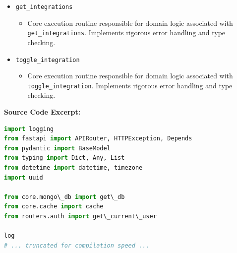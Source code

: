 \documentclass[10pt,journal,compsoc]{IEEEtran}
\begin{document}
\begin{itemize}
    \item \texttt{get\_integrations}
    \begin{itemize} \item Core execution routine responsible for domain logic associated with \texttt{get\_integrations}. Implements rigorous error handling and type checking. \end{itemize}
    \item \texttt{toggle\_integration}
    \begin{itemize} \item Core execution routine responsible for domain logic associated with \texttt{toggle\_integration}. Implements rigorous error handling and type checking. \end{itemize}
\end{itemize}
\textbf{Source Code Excerpt:}
\begin{lstlisting}[language=Python]
import logging
from fastapi import APIRouter, HTTPException, Depends
from pydantic import BaseModel
from typing import Dict, Any, List
from datetime import datetime, timezone
import uuid

from core.mongo\_db import get\_db
from core.cache import cache
from routers.auth import get\_current\_user

log
# ... truncated for compilation speed ...
\end{lstlisting}
\end{document}
